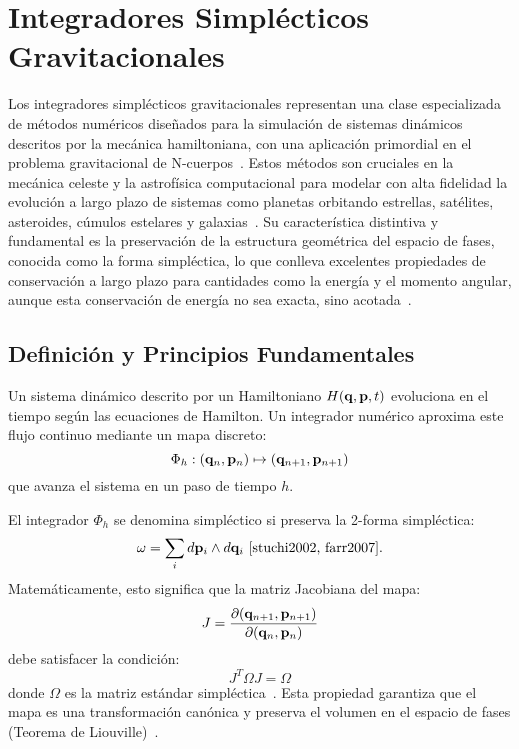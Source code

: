 \section[Integradores Simplécticos]{Integradores Simplécticos Gravitacionales}%
\label{sec:IntegradoresSimplecticos}

Los integradores simplécticos gravitacionales representan una clase especializada de métodos numéricos diseñados para la simulación de sistemas dinámicos descritos por la mecánica hamiltoniana, con una aplicación primordial en el problema gravitacional de N-cuerpos~\cite{wisdom1991, stuchi2002}. Estos métodos son cruciales en la mecánica celeste y la astrofísica computacional para modelar con alta fidelidad la evolución a largo plazo de sistemas como planetas orbitando estrellas, satélites, asteroides, cúmulos estelares y galaxias~\cite{wisdom1991, chin2005, hernandez2020}. Su característica distintiva y fundamental es la preservación de la estructura geométrica del espacio de fases, conocida como la forma simpléctica, lo que conlleva excelentes propiedades de conservación a largo plazo para cantidades como la energía y el momento angular, aunque esta conservación de energía no sea exacta, sino acotada~\cite{stuchi2002, farr2007, yoshida1993}.

\subsection{Definición y Principios Fundamentales}
Un sistema dinámico descrito por un Hamiltoniano \( H(\mathbf{q}, \mathbf{p}, t) \) evoluciona en el tiempo según las ecuaciones de Hamilton. Un integrador numérico aproxima este flujo continuo mediante un mapa discreto:
\begin{equation}
    \Phi_h: (\mathbf{q}_n, \mathbf{p}_n) \mapsto (\mathbf{q}_{n+1}, \mathbf{p}_{n+1})
\end{equation}
que avanza el sistema en un paso de tiempo \(h\).

El integrador \(\Phi_h\) se denomina simpléctico si preserva la 2-forma simpléctica:
\begin{equation}
    \omega = \sum_i d\mathbf{p}_i \wedge d\mathbf{q}_i \text{~\cite{stuchi2002, farr2007}.}
\end{equation}
Matemáticamente, esto significa que la matriz Jacobiana del mapa:
\begin{equation}
    J = \frac{\partial(\mathbf{q}_{n+1}, \mathbf{p}_{n+1})}{\partial(\mathbf{q}_n, \mathbf{p}_n)}
\end{equation}
debe satisfacer la condición:
\begin{equation}
    J^T \Omega J = \Omega
\end{equation}
donde \(\Omega\) es la matriz estándar simpléctica~\cite{farr2007, yoshida1993}. Esta propiedad garantiza que el mapa es una transformación canónica y preserva el volumen en el espacio de fases (Teorema de Liouville)~\cite{wisdom1991, stuchi2002}.

